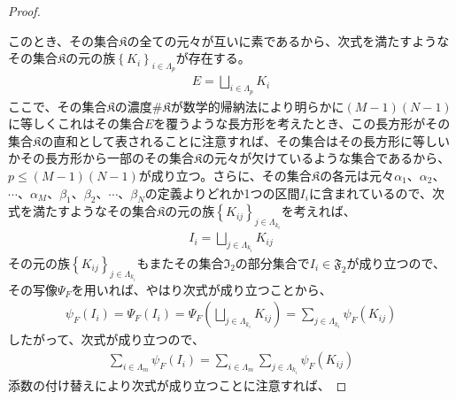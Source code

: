 \documentclass[dvipdfmx]{jsarticle}
\begin{document}
\begin{proof}
\begin{center}
\end{center}
このとき、その集合$\mathfrak{K}$の全ての元々が互いに素であるから、次式を満たすようなその集合$\mathfrak{K}$の元の族$\left\{ K_{i} \right\}_{i \in \varLambda_{p}}$が存在する。
\begin{align*}
E = \bigsqcup_{i \in \varLambda_{p}} K_{i}
\end{align*}
ここで、その集合$\mathfrak{K}$の濃度$\#\mathfrak{K}$が数学的帰納法により明らかに$(M - 1)(N - 1)$に等しくこれはその集合$E$を覆うような長方形を考えたとき、この長方形がその集合$\mathfrak{K}$の直和として表されることに注意すれば、その集合はその長方形に等しいかその長方形から一部のその集合$\mathfrak{K}$の元々が欠けているような集合であるから、$p \leq (M - 1)(N - 1)$が成り立つ。さらに、その集合$\mathfrak{K}$の各元は元々$\alpha_{1}$、$\alpha_{2}$、$\cdots$、$\alpha_{M}$、$\beta_{1}$、$\beta_{2}$、$\cdots$、$\beta_{N}$の定義よりどれか1つの区間$I_{i}$に含まれているので、次式を満たすようなその集合$\mathfrak{K}$の元の族$\left\{ K_{ij} \right\}_{j \in \varLambda_{k_{i}}}$を考えれば、
\begin{align*}
I_{i} = \bigsqcup_{j \in \varLambda_{k_{i}}} K_{ij}
\end{align*}
その元の族$\left\{ K_{ij} \right\}_{j \in \varLambda_{k_{i}}}$もまたその集合$\mathfrak{I}_{2}$の部分集合で$I_{i} \in \mathfrak{F}_{2}$が成り立つので、その写像$\varPsi_{F}$を用いれば、やはり次式が成り立つことから、
\begin{align*}
\psi_{F}\left( I_{i} \right) = \varPsi_{F}\left( I_{i} \right) = \varPsi_{F}\left( \bigsqcup_{j \in \varLambda_{k_{i}}} K_{ij} \right) = \sum_{j \in \varLambda_{k_{i}}} {\psi_{F}\left( K_{ij} \right)}
\end{align*}
したがって、次式が成り立つので、
\begin{align*}
\sum_{i \in \varLambda_{m}} {\psi_{F}\left( I_{i} \right)} = \sum_{i \in \varLambda_{m}} {\sum_{j \in \varLambda_{k_{i}}} {\psi_{F}\left( K_{ij} \right)}}
\end{align*}
添数の付け替えにより次式が成り立つことに注意すれば、

\end{proof}
\end{document}
